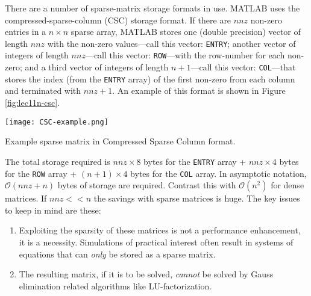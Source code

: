 There are a number of sparse-matrix storage formats in use.  MATLAB uses the compressed-sparse-column (CSC) storage format.\cite{gilbert1992sparse}  If there are $nnz$ non-zero entries in a $n \times n$ sparse array, MATLAB stores one (double precision) vector of length $nnz$ with the non-zero values---call this vector: \lstinline[style=myMatlab]{ENTRY}; another vector of integers of length $nnz$---call this vector: \lstinline[style=myMatlab]{ROW}---with the row-number for each non-zero; and a third vector of integers of length $n+1$---call this vector: \lstinline[style=myMatlab]{COL}---that stores the index (from the \lstinline[style=myMatlab]{ENTRY} array) of the first non-zero from each column and terminated with $nnz+1$.  An example of this format is shown in Figure \ref{fig:lec11n-csc}. \begin{marginfigure}
\texttt{[image: CSC-example.png]}
\caption{Example sparse matrix in Compressed Sparse Column format.}
\label{fig:lec11n-csc}
\end{marginfigure} The total storage required is $nnz \times 8$ bytes for the \lstinline[style=myMatlab]{ENTRY} array + $nnz \times 4$ bytes for the \lstinline[style=myMatlab]{ROW} array + $(n+1) \times 4$ bytes for the \lstinline[style=myMatlab]{COL} array.  In asymptotic notation, $\mathcal{O}(nnz+n)$ bytes of storage are required.  Contrast this with $\mathcal{O}(n^2)$ for dense matrices.  If $nnz << n$ the savings with sparse matrices is huge.  The key issues to keep in mind are these:
\begin{enumerate}
\item Exploiting the sparsity of these matrices is not a performance enhancement, it is a necessity.  Simulations of practical interest often result in systems of equations that can \emph{only} be stored as a sparse matrix.
\item The resulting matrix, if it is to be solved, \emph{cannot} be solved by Gauss elimination related algorithms like LU-factorization.
\end{enumerate}

